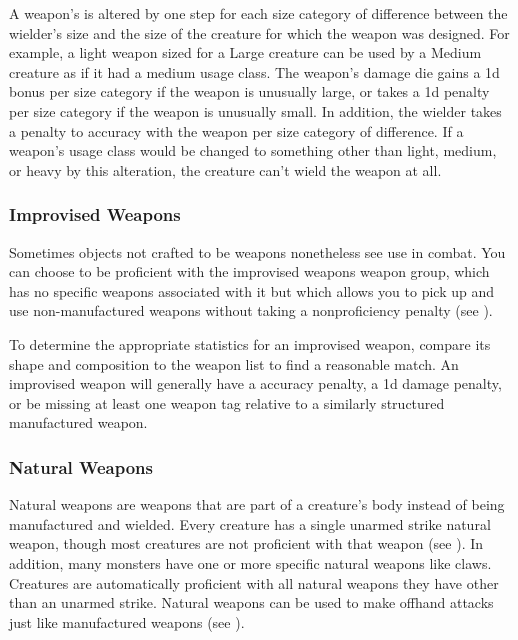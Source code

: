                 \label{Inappropriately Sized Weapons} A weapon's  is altered by one step for each size category of difference between the wielder's size and the size of the creature for which the weapon was designed.
                For example, a light weapon sized for a Large creature can be used by a Medium creature as if it had a medium usage class.
                The weapon's damage die gains a \plus1d bonus per size category if the weapon is unusually large, or takes a \minus1d penalty per size category if the weapon is unusually small.
                In addition, the wielder takes a  penalty to accuracy with the weapon per size category of difference.
                If a weapon's usage class would be changed to something other than light, medium, or heavy by this alteration, the creature can't wield the weapon at all.

        \subsubsection{Improvised Weapons}\label{Improvised Weapons}
            Sometimes objects not crafted to be weapons nonetheless see use in combat.
            You can choose to be proficient with the improvised weapons weapon group, which has no specific weapons associated with it but which allows you to pick up and use non-manufactured weapons without taking a nonproficiency penalty (see ).

            To determine the appropriate statistics for an improvised weapon, compare its shape and composition to the weapon list to find a reasonable match.
            An improvised weapon will generally have a  accuracy penalty, a \minus1d damage penalty, or be missing at least one weapon tag relative to a similarly structured manufactured weapon.

        \subsubsection{Natural Weapons}\label{Natural Weapons}
            Natural weapons are weapons that are part of a creature's body instead of being manufactured and wielded.
            Every creature has a single unarmed strike natural weapon, though most creatures are not proficient with that weapon (see ).
            In addition, many monsters have one or more specific natural weapons like claws.
            Creatures are automatically proficient with all natural weapons they have other than an unarmed strike.
            Natural weapons can be used to make offhand attacks just like manufactured weapons (see ).

